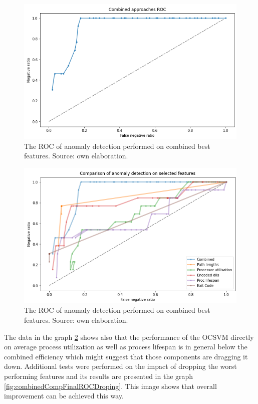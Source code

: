 \documentclass[a4paper,twoside,12pt]{book}
\begin{document}
\begin{figure}
	\centering
	\includegraphics[scale=0.9]{images/CombinedFinalROC}
	\caption{The ROC of anomaly detection performed on combined best features. Source: own elaboration.}
	\label{fig:combinedFinalROC}
 \end{figure}


 \begin{figure}
	\centering
	\includegraphics[scale=0.9]{images/CombinedCompFinalROC}
	\caption{The ROC of anomaly detection performed on combined best features. Source: own elaboration.}
	\label{fig:combinedCompFinalROC}
 \end{figure}

The data in the graph \ref{fig:combinedCompFinalROC} shows also that the performance of the OCSVM directly on average process utilization
as well as process lifespan is in general below the combined efficiency which might suggest that those components are dragging it down. 
Additional tests were performed on the impact of dropping the worst performing features and its results are presented in the
graph \ref{fig:combinedCompFinalROCDroping}. This image shows that overall improvement can be achieved this way.
\end{document}
